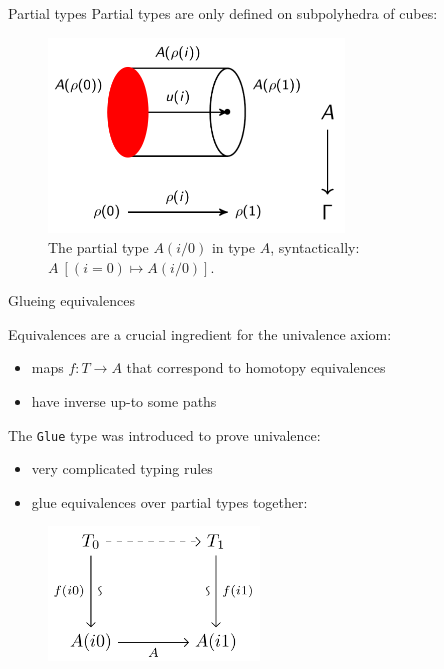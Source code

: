 \documentclass[english]{beamer}
\begin{document}
\begin{frame}{Partial types} 
 Partial types are only defined on subpolyhedra of cubes:
 
 
 \begin{figure}
    \centering
  \includegraphics[width=0.7\textwidth]{figures/types_side}
  \caption{The partial type $A(i/0)$ in type $A$, syntactically: $A\ [(i = 0) \mapsto A(i/0)]$.}
 \end{figure}

 
 
\end{frame}

\begin{frame}{Glueing equivalences}
  
  Equivalences are a crucial ingredient for the univalence axiom:
  \begin{itemize}
   \item maps $f : T \rightarrow A$ that correspond to homotopy equivalences
   \item have inverse up-to some paths
  \end{itemize}

  
   The \texttt{Glue} type was introduced to prove univalence:
   \begin{itemize}
    \item very complicated typing rules
    \item glue equivalences  over partial types together:
   \end{itemize}

 
\begin{figure}
 \includegraphics[width=0.5\textwidth]{figures/glue}
\end{figure}

  
 
\end{frame}
\end{document}
